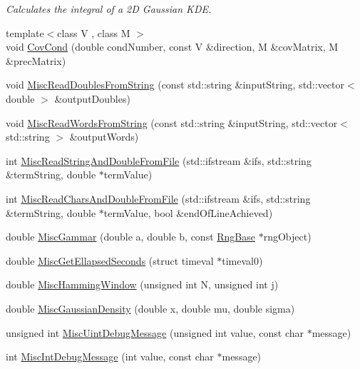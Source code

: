 \begin{DoxyCompactItemize}
\begin{DoxyCompactList}\small\item\em Calculates the integral of a 2\-D Gaussian K\-D\-E. \end{DoxyCompactList}\item 
{\footnotesize template$<$class V , class M $>$ }\\void \hyperlink{namespace_q_u_e_s_o_a1f8ccd7acd730666bd114f1f3ed33f82}{Cov\-Cond} (double cond\-Number, const V \&direction, M \&cov\-Matrix, M \&prec\-Matrix)
\item 
void \hyperlink{namespace_q_u_e_s_o_ac3fab438679d1dc864f8d629881dad2e}{Misc\-Read\-Doubles\-From\-String} (const std\-::string \&input\-String, std\-::vector$<$ double $>$ \&output\-Doubles)
\item 
void \hyperlink{namespace_q_u_e_s_o_a9e0f636bad9d30e3d0fa1589a61d0567}{Misc\-Read\-Words\-From\-String} (const std\-::string \&input\-String, std\-::vector$<$ std\-::string $>$ \&output\-Words)
\item 
int \hyperlink{namespace_q_u_e_s_o_af0fc61c58d0ca592fa172eeab540d39c}{Misc\-Read\-String\-And\-Double\-From\-File} (std\-::ifstream \&ifs, std\-::string \&term\-String, double $\ast$term\-Value)
\item 
int \hyperlink{namespace_q_u_e_s_o_a575d3153d82b7df3d78ad5cfbf2b83b7}{Misc\-Read\-Chars\-And\-Double\-From\-File} (std\-::ifstream \&ifs, std\-::string \&term\-String, double $\ast$term\-Value, bool \&end\-Of\-Line\-Achieved)
\item 
double \hyperlink{namespace_q_u_e_s_o_a4f268914e653262df98af86aeb33285f}{Misc\-Gammar} (double a, double b, const \hyperlink{class_q_u_e_s_o_1_1_rng_base}{Rng\-Base} $\ast$rng\-Object)
\item 
double \hyperlink{namespace_q_u_e_s_o_a424bc33f2e6e287fd468408d14b772ee}{Misc\-Get\-Ellapsed\-Seconds} (struct timeval $\ast$timeval0)
\item 
double \hyperlink{namespace_q_u_e_s_o_a48c1ad47c8bebad572842726591e9d3f}{Misc\-Hamming\-Window} (unsigned int N, unsigned int j)
\item 
double \hyperlink{namespace_q_u_e_s_o_a0f94e9b1e8f415c389f180d4a75c5591}{Misc\-Gaussian\-Density} (double x, double mu, double sigma)
\item 
unsigned int \hyperlink{namespace_q_u_e_s_o_a2f606febc1ff24dc4b427c68b4bb845e}{Misc\-Uint\-Debug\-Message} (unsigned int value, const char $\ast$message)
\item 
int \hyperlink{namespace_q_u_e_s_o_ae9763e7b3ff5f5e2a19bb440f7b7bb4e}{Misc\-Int\-Debug\-Message} (int value, const char $\ast$message)

\end{DoxyCompactItemize}
